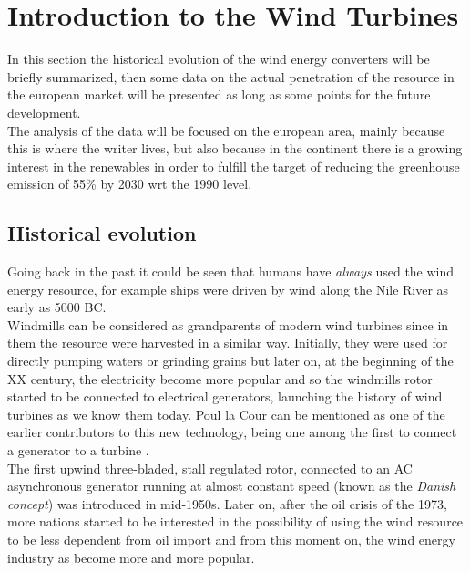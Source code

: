 \newpage
\section{Introduction to the Wind Turbines}\label{sec:c_WT_characteristics}
In this section the historical evolution of the wind energy converters will be briefly summarized, then some data on the actual penetration of the resource in the european market will be presented as long as some points for the future development. \\
The analysis of the data will be focused on the european area, mainly because this is where the writer lives, but also because in the continent there is a growing interest in the renewables in order to fulfill the target of reducing the greenhouse emission of 55\% by 2030 wrt the 1990 level. 

\subsection{Historical evolution}
Going back in the past it could be seen that humans have \textit{always} used the wind energy resource, for example ships were driven by wind along the Nile River as early as 5000 BC.\\
Windmills can be considered as grandparents of modern wind turbines since in them the resource were harvested in a similar way. Initially, they were used for directly pumping waters or grinding grains but later on, at the beginning of the XX century, the electricity become more popular and so the windmills rotor started to be connected to electrical generators, launching the history of wind turbines as we know them today. Poul la Cour can be mentioned as one of the earlier contributors to this new technology, being one among the first to connect a generator to a turbine \cite{Aerodynamics_of_wind_turbines}. \\
The first upwind three-bladed, stall regulated rotor, connected to an AC asynchronous generator running at almost constant speed (known as the \textit{Danish concept}) was introduced in mid-1950s. Later on, after the oil crisis of the 1973, more nations started to be interested in the possibility of using the wind resource to be less dependent from oil import and from this moment on, the wind energy industry as become more and more popular. 

